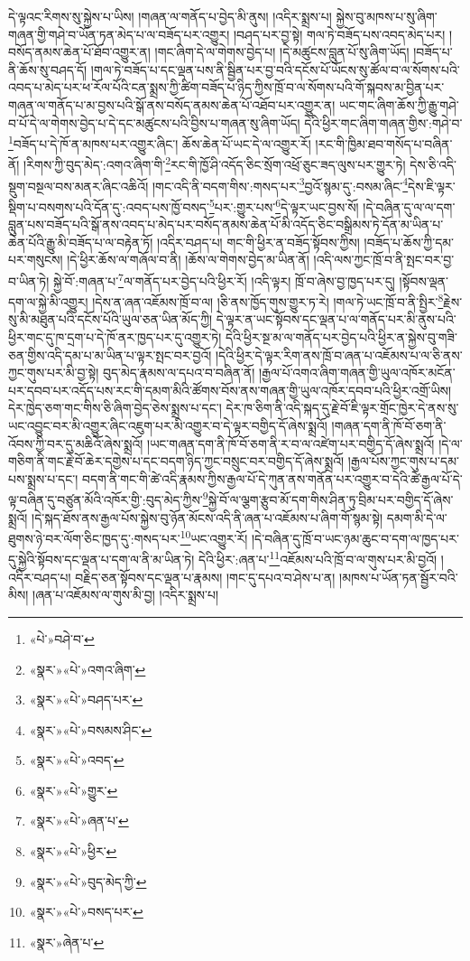 དེ་ལྟའང་རིགས་སུ་སྐྱེས་པ་ཡིས། །གཞན་ལ་གནོད་པ་བྱེད་མི་ནུས། །འདིར་སྨྲས་པ། སྐྱེས་བུ་མཁས་པ་སུ་ཞིག་གཞན་གྱི་གཤེ་བ་ཡོན་ཏན་མེད་པ་ལ་བཟོད་པར་འགྱུར། །བཤད་པར་བྱ་སྟེ། གལ་ཏེ་བཟོད་པས་འབད་མེད་པར། །བསོད་ནམས་ཆེན་པོ་ཐོབ་འགྱུར་ན། །གང་ཞིག་དེ་ལ་གེགས་བྱེད་པ། །དེ་མཚུངས་བླུན་པོ་སུ་ཞིག་ཡོད། །བཟོད་པ་ནི་ཆོས་སུ་བཤད་དོ། །གལ་ཏེ་བཟོད་པ་དང་ལྡན་པས་ནི་སྦྱིན་པར་བྱ་བའི་དངོས་པོ་ཡོངས་སུ་ཚོལ་བ་ལ་སོགས་པའི་འབད་པ་མེད་པར་ཕ་རོལ་པོའི་ངན་སྨྲས་ཀྱི་ཚིག་བཟོད་པ་ཉིད་ཀྱིས་ཁྲོ་བ་ལ་སོགས་པའི་གོ་སྐབས་མ་བྱིན་པར་གཞན་ལ་གནོད་པ་མ་བྱས་པའི་སྒོ་ནས་བསོད་ནམས་ཆེན་པོ་འཐོབ་པར་འགྱུར་ན། ཡང་གང་ཞིག་ཆོས་ཀྱི་རྒྱུ་གཤེ་བ་པོ་དེ་ལ་གེགས་བྱེད་པ་དེ་དང་མཚུངས་པའི་བྱིས་པ་གཞན་སུ་ཞིག་ཡོད། དེའི་ཕྱིར་གང་ཞིག་གཞན་གྱིས་:གཤེ་བ་\footnote{«པེ་»བཤེ་བ་}བཟོད་པ་དེ་ཁོ་ན་མཁས་པར་འགྱུར་ཞིང་། ཆོས་ཆེན་པོ་ཡང་དེ་ལ་འགྱུར་རོ། །རང་གི་ཁྱིམ་ཐབ་གསོད་པ་བཞིན་ནོ། །རིགས་ཀྱི་བུད་མེད་:འགའ་ཞིག་གི་\footnote{«སྣར་»«པེ་»འགའ་ཞིག་}རང་གི་ཁྱོ་ཤི་འདོད་ཅིང་སྲོག་འཕྲོ་ཅུང་ཟད་ལུས་པར་གྱུར་ཏེ། དེས་ཅི་འདི་སྡུག་བསྔལ་བས་མནར་ཞིང་འཆིའོ། །གང་འདི་ནི་བདག་གིས་:གསད་པར་\footnote{«སྣར་»«པེ་»བཤད་པར་}བྱའོ་སྙམ་དུ་:བསམ་ཞིང་\footnote{«སྣར་»«པེ་»བསམས་ཤིང་}དེས་ཇི་ལྟར་སྡིག་པ་བསགས་པའི་དོན་དུ་:འབད་པས་ཁྱོ་བསད་\footnote{«སྣར་»«པེ་»འབད་}པར་:གྱུར་པས་\footnote{«སྣར་»«པེ་»གྱུར་}དེ་ལྟར་ཡང་བྱས་སོ། །དེ་བཞིན་དུ་ལ་ལ་དག་བླུན་པས་བཟོད་པའི་སྒོ་ནས་འབད་པ་མེད་པར་བསོད་ནམས་ཆེན་པོ་མི་འདོད་ཅིང་བསྒྲིམས་ཏེ་དོན་མ་ཡིན་པ་ཆེན་པོའི་རྒྱུ་མི་བཟོད་པ་ལ་བརྟེན་ཏོ། །འདིར་བཤད་པ། གང་གི་ཕྱིར་ན་བཟོད་སྟོབས་ཀྱིས། །བཟོད་པ་ཆོས་ཀྱི་དམ་པར་གསུངས། །དེ་ཕྱིར་ཆོས་ལ་གཞོལ་བ་ནི། །ཆོས་ལ་གེགས་བྱེད་མ་ཡིན་ནོ། །འདི་ལས་ཀྱང་ཁྲོ་བ་ནི་སྤང་བར་བྱ་བ་ཡིན་ཏེ། སྐྱེ་བོ་:གཞན་པ་\footnote{«སྣར་»«པེ་»ཞན་པ་}ལ་གནོད་པར་བྱེད་པའི་ཕྱིར་རོ། །འདི་ལྟར། ཁྲོ་བ་ཞེས་བྱ་ཁྱད་པར་དུ། །སྟོབས་ལྡན་དག་ལ་སྐྱེ་མི་འགྱུར། །དེས་ན་ཞན་འཇོམས་ཁྲོ་བ་ལ། །ཅི་ནས་ཁྱོད་གུས་གྱུར་ཏ་རེ། །གལ་ཏེ་ཡང་ཁྲོ་བ་ནི་སྤྱིར་\footnote{«སྣར་»«པེ་»ཕྱིར་}རྗེས་སུ་མི་མཐུན་པའི་དངོས་པོའི་ཡུལ་ཅན་ཡིན་མོད་ཀྱི། དེ་ལྟར་ན་ཡང་སྟོབས་དང་ལྡན་པ་ལ་གནོད་པར་མི་ནུས་པའི་ཕྱིར་གང་དུ་ཁ་དྲག་པ་དེ་ཁོ་ནར་ཁྱད་པར་དུ་འགྱུར་ཏེ། དེའི་ཕྱིར་སྔ་མ་ལ་གནོད་པར་བྱེད་པའི་ཕྱིར་ན་སྐྱེས་བུ་གཟི་ཅན་གྱིས་འདི་དམ་པ་མ་ཡིན་པ་ལྟར་སྤང་བར་བྱའོ། །དེའི་ཕྱིར་དེ་ལྟར་རིག་ནས་ཁྲོ་བ་ཞན་པ་འཇོམས་པ་ལ་ཅི་ནས་ཀྱང་གུས་པར་མི་བྱ་སྟེ། བུད་མེད་རྣམས་ལ་དཔའ་བ་བཞིན་ནོ། །རྒྱལ་པོ་འགའ་ཞིག་གཞན་གྱི་ཡུལ་འཁོར་མངོན་པར་དབབ་པར་འདོད་པས་རང་གི་དམག་མིའི་ཚོགས་བོས་ནས་གཞན་གྱི་ཡུལ་འཁོར་དབབ་པའི་ཕྱིར་འགྲོ་ཡིས། དེར་ཁྱེད་ཅག་གང་གིས་ཅི་ཞིག་བྱེད་ཅེས་སྨྲས་པ་དང་། དེར་ཁ་ཅིག་ནི་འདི་སྐད་དུ་རྗེ་བོ་ཇི་ལྟར་གྲོང་ཁྱེར་དེ་ནས་སུ་ཡང་འབྱུང་བར་མི་འགྱུར་ཞིང་འཇུག་པར་མི་འགྱུར་བ་དེ་ལྟར་བགྱིད་དོ་ཞེས་སྨྲའོ། །གཞན་དག་ནི་ཁོ་བོ་ཅག་ནི་འོབས་ཀྱི་བར་དུ་མཆིའོ་ཞེས་སྨྲའོ། །ཡང་གཞན་དག་ནི་ཁོ་བོ་ཅག་ནི་ར་བ་ལ་འཛེག་པར་བགྱིད་དོ་ཞེས་སྨྲའོ། །དེ་ལ་གཅིག་ནི་གང་རྗེ་བོ་ཆེར་དགྱེས་པ་དང་བདག་ཉིད་ཀྱང་བསྲུང་བར་བགྱིད་དོ་ཞེས་སྨྲའོ། །རྒྱལ་པོས་ཀྱང་གུས་པ་དམ་པས་སྨྲས་པ་དང་། བདག་ནི་གང་གི་ཚེ་འདི་རྣམས་ཀྱིས་རྒྱལ་པོ་དེ་ཀུན་ནས་གནོན་པར་འགྱུར་བ་དེའི་ཚེ་རྒྱལ་པོ་དེ་ལྟ་བཞིན་དུ་བཙུན་མོའི་འཁོར་གྱི་:བུད་མེད་ཀྱིས་\footnote{«སྣར་»«པེ་»བུད་མེད་ཀྱི་}སྐྱེ་བོ་ལ་ལྕག་རྩུབ་མོ་དག་གིས་ཤིན་ཏུ་བྲིམ་པར་བགྱིད་དོ་ཞེས་སྨྲའོ། །དེ་སྐད་ཐོས་ནས་རྒྱལ་པོས་སྐྱེས་བུ་ཉོན་མོངས་འདི་ནི་ཞན་པ་འཇོམས་པ་ཞིག་གོ་སྙམ་སྟེ། དམག་མི་དེ་ལ་ཐུགས་ཉེ་བར་ལོག་ཅིང་ཁྱད་དུ་:གསད་པར་\footnote{«སྣར་»«པེ་»བསད་པར་}ཡང་འགྱུར་རོ། །དེ་བཞིན་དུ་ཁྲོ་བ་ཡང་ཉམ་ཆུང་བ་དག་ལ་ཁྱད་པར་དུ་སྐྱེའི་སྟོབས་དང་ལྡན་པ་དག་ལ་ནི་མ་ཡིན་ཏེ། དེའི་ཕྱིར་:ཞན་པ་\footnote{«སྣར་»ཞེན་པ་}འཇོམས་པའི་ཁྲོ་བ་ལ་གུས་པར་མི་བྱའོ། །འདིར་བཤད་པ། བརྗིད་ཅན་སྟོབས་དང་ལྡན་པ་རྣམས། །གང་དུ་དཔའ་བ་ཤེས་པ་ན། །མཁས་པ་ཡོན་ཏན་སྦྱོར་བའི་མིས། །ཞན་པ་འཇོམས་ལ་གུས་མི་བྱ། །འདིར་སྨྲས་པ། 